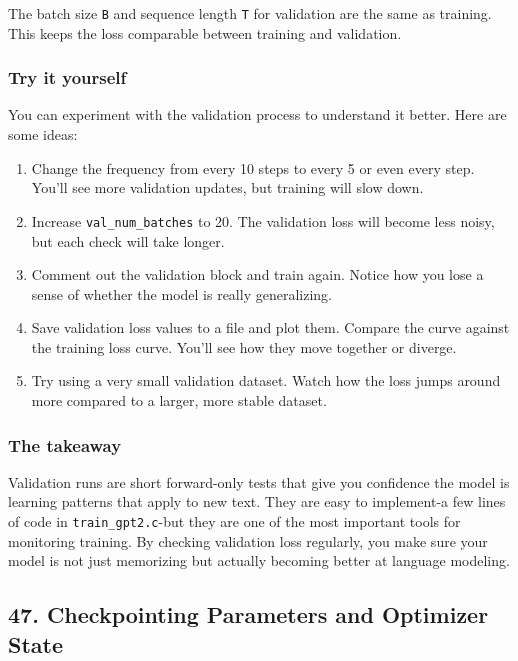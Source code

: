 \documentclass[
  letterpaper,
  DIV=11,
  numbers=noendperiod]{scrreprt}
\providecommand{\tightlist}{%
  \setlength{\itemsep}{0pt}\setlength{\parskip}{0pt}}
\begin{document}
The batch size \texttt{B} and sequence length \texttt{T} for validation
are the same as training. This keeps the loss comparable between
training and validation.

\subsubsection{Try it yourself}\label{try-it-yourself-34}

You can experiment with the validation process to understand it better.
Here are some ideas:

\begin{enumerate}
\def\labelenumi{\arabic{enumi}.}
\tightlist
\item
  Change the frequency from every 10 steps to every 5 or even every
  step. You'll see more validation updates, but training will slow down.
\item
  Increase \texttt{val\_num\_batches} to 20. The validation loss will
  become less noisy, but each check will take longer.
\item
  Comment out the validation block and train again. Notice how you lose
  a sense of whether the model is really generalizing.
\item
  Save validation loss values to a file and plot them. Compare the curve
  against the training loss curve. You'll see how they move together or
  diverge.
\item
  Try using a very small validation dataset. Watch how the loss jumps
  around more compared to a larger, more stable dataset.
\end{enumerate}

\subsubsection{The takeaway}\label{the-takeaway-35}

Validation runs are short forward-only tests that give you confidence
the model is learning patterns that apply to new text. They are easy to
implement-a few lines of code in \texttt{train\_gpt2.c}-but they are one
of the most important tools for monitoring training. By checking
validation loss regularly, you make sure your model is not just
memorizing but actually becoming better at language modeling.

\subsection{47. Checkpointing Parameters and Optimizer
State}\label{checkpointing-parameters-and-optimizer-state}
\end{document}
